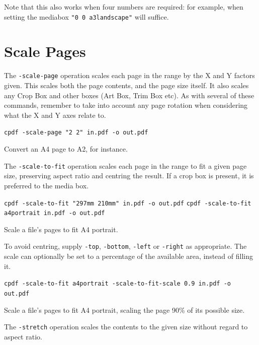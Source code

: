\documentclass{book}
\begin{document}
\noindent Note that this also works when four numbers are required: for example, when setting the mediabox \texttt{"0 0 a3landscape"} will suffice.

  \section{Scale Pages}
  The \texttt{-scale-page} operation scales each page in the range by the X and
Y factors given. This scales both the page contents, and the page size itself. It also scales any Crop Box and other boxes (Art Box, Trim Box etc). As with several of these commands, remember to take into account any page rotation when considering what the X and Y axes relate to.

  \begin{framed}
  \small\noindent\verb!cpdf -scale-page "2 2" in.pdf -o out.pdf!

  \vspace{2.5mm}
  \noindent Convert an A4 page to A2, for instance.
  \end{framed}

  \noindent The \texttt{-scale-to-fit} operation scales each page in the range to fit a
  given page size, preserving aspect ratio and centring the result. If a crop box is present, it is preferred to the media box.

  \begin{framed}
  \small\noindent\verb!cpdf -scale-to-fit "297mm 210mm" in.pdf -o out.pdf!
  \small\noindent\verb!cpdf -scale-to-fit a4portrait in.pdf -o out.pdf!

  \vspace{2.5mm}
  \noindent Scale a file's pages to fit A4 portrait.
  \end{framed}
  
\noindent To avoid centring, supply \texttt{-top}, \texttt{-bottom}, \texttt{-left} or \texttt{-right} as appropriate. The scale can optionally be set to a percentage of the available area, instead of filling it.
  \begin{framed}
  \small\noindent\verb!cpdf -scale-to-fit a4portrait -scale-to-fit-scale 0.9 in.pdf -o out.pdf!


  \vspace{2.5mm}
  \noindent Scale a file's pages to fit A4 portrait, scaling the page 90\% of its possible size.
  \end{framed}

\noindent The \texttt{-stretch} operation scales the contents to the given size without regard to aspect ratio.
\end{document}
